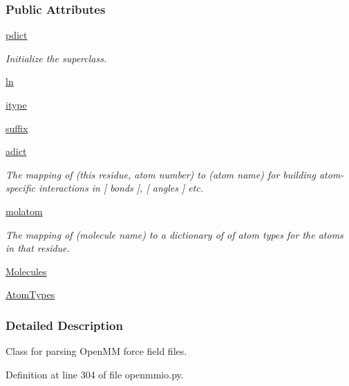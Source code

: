 \subsubsection*{Public Attributes}
\begin{DoxyCompactItemize}
\item 
\hyperlink{classforcebalance_1_1openmmio_1_1OpenMM__Reader_a4fa2da992c7f0f525dcc465ffba69b86}{pdict}
\begin{DoxyCompactList}\small\item\em Initialize the superclass. \end{DoxyCompactList}\item 
\hyperlink{classforcebalance_1_1BaseReader_a80c8e3bea212600742968aa8669e557b}{ln}
\item 
\hyperlink{classforcebalance_1_1BaseReader_a22ff3f4c684c728e019d801fface36f6}{itype}
\item 
\hyperlink{classforcebalance_1_1BaseReader_a48ef0584a1b6b4b6f8eb741ad8465db8}{suffix}
\item 
\hyperlink{classforcebalance_1_1BaseReader_a2c46ad6b66cf09a30e917ce4a1997e2a}{adict}
\begin{DoxyCompactList}\small\item\em The mapping of (this residue, atom number) to (atom name) for building atom-\/specific interactions in \mbox{[} bonds \mbox{]}, \mbox{[} angles \mbox{]} etc. \end{DoxyCompactList}\item 
\hyperlink{classforcebalance_1_1BaseReader_ab444c213e15929253dd73395ac5f19fc}{molatom}
\begin{DoxyCompactList}\small\item\em The mapping of (molecule name) to a dictionary of of atom types for the atoms in that residue. \end{DoxyCompactList}\item 
\hyperlink{classforcebalance_1_1BaseReader_a4369b5fb663a83b11602daa71db6862e}{Molecules}
\item 
\hyperlink{classforcebalance_1_1BaseReader_a69ca7d949a4a3df4d9f61e617fe0e270}{Atom\-Types}
\end{DoxyCompactItemize}


\subsubsection{Detailed Description}
Class for parsing Open\-M\-M force field files. 



Definition at line 304 of file openmmio.\-py.



